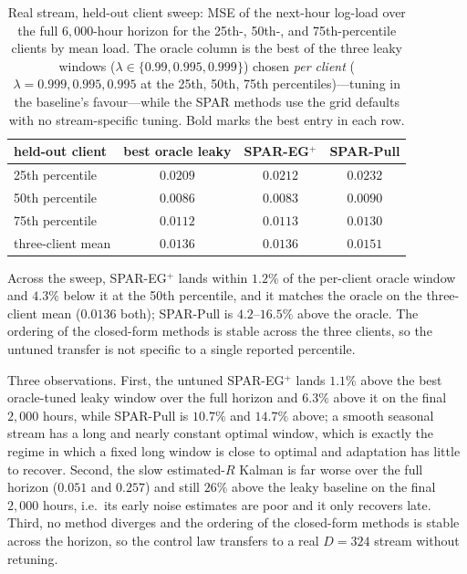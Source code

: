 \begin{table}[!htbp]
\centering
\footnotesize
\setlength{\tabcolsep}{5pt}
\caption{Real stream, held-out client sweep: MSE of the next-hour log-load over the full $6{,}000$-hour horizon for the 25th-, 50th-, and 75th-percentile clients by mean load.
The oracle column is the best of the three leaky windows ($\lambda \in \{0.99, 0.995, 0.999\}$) chosen \emph{per client} ($\lambda = 0.999, 0.995, 0.995$ at the 25th, 50th, 75th percentiles)---tuning in the baseline's favour---while the SPAR methods use the grid defaults with no stream-specific tuning.
Bold marks the best entry in each row.}
\label{tab:electricity-clients}
\begin{tabular}{lccc}
\toprule
held-out client & best oracle leaky & SPAR-EG$^+$ & SPAR-Pull \\
\midrule
25th percentile & $\mathbf{0.0209}$ & $0.0212$ & $0.0232$ \\
50th percentile & $0.0086$ & $\mathbf{0.0083}$ & $0.0090$ \\
75th percentile & $\mathbf{0.0112}$ & $0.0113$ & $0.0130$ \\
\midrule
three-client mean & $\mathbf{0.0136}$ & $\mathbf{0.0136}$ & $0.0151$ \\
\bottomrule
\end{tabular}
\end{table}

Across the sweep, SPAR-EG$^+$ lands within $1.2\%$ of the per-client oracle window and $4.3\%$ below it at the 50th percentile, and it matches the oracle on the three-client mean ($0.0136$ both); SPAR-Pull is $4.2$--$16.5\%$ above the oracle.
The ordering of the closed-form methods is stable across the three clients, so the untuned transfer is not specific to a single reported percentile.

Three observations.
First, the untuned SPAR-EG$^+$ lands $1.1\%$ above the best oracle-tuned leaky window over the full horizon and $6.3\%$ above it on the final $2{,}000$ hours, while SPAR-Pull is $10.7\%$ and $14.7\%$ above; a smooth seasonal stream has a long and nearly constant optimal window, which is exactly the regime in which a fixed long window is close to optimal and adaptation has little to recover.
Second, the slow estimated-$R$ Kalman is far worse over the full horizon ($0.051$ and $0.257$) and still $26\%$ above the leaky baseline on the final $2{,}000$ hours, i.e.\ its early noise estimates are poor and it only recovers late.
Third, no method diverges and the ordering of the closed-form methods is stable across the horizon, so the control law transfers to a real $D = 324$ stream without retuning.

